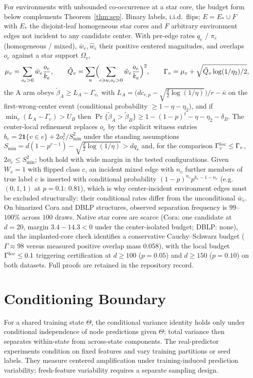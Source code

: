 \documentclass[preprint,11pt]{elsarticle}
\newcommand{\ind}[1]{\mathbf{1}\{#1\}}
\begin{document}
For environments with unbounded co-occurrence at a star core, the
budget form below complements Theorem~\ref{thm:sep}. Binary labels,
i.i.d.\ flips; $E=E_\ast\cup F$ with $E_\ast$ the disjoint-leaf
homogeneous star cores and $F$ arbitrary environment edges not
incident to any candidate center. With per-edge rates $q_e$ /
$\pi_e$ (homogeneous / mixed), $\bar w_e,\hat w_e$ their positive
centered magnitudes, and overlaps $o_e$ against a star support
$\Omega_v$,
\[
\mu_v=\sum_{o_e>0}\bar w_e\frac{o_e}{k_e},\qquad
\tilde Q_v=\sum_u\Bigl(\sum_{e\ni u,o_e>0}\hat w_e\frac{o_e}{k_e}
\Bigr)^2,\qquad
\Gamma_v=\mu_v+\sqrt{\tilde Q_v\log(1/\eta_2)/2},
\]
the A arm obeys $\widetilde\beta_A\ge L_A-\Gamma_{v_\ast}$ with
$L_A=\bigl(dc_{r,p}-\sqrt{\tfrac d2\log(1/\eta)}\bigr)/r-\bar\kappa$
on the first-wrong-center event (conditional probability
$\ge1-\eta-\eta_2$), and if $\min_v(L_A-\Gamma_v)>U_B$ then
$\Pr\{\widetilde\beta_A>\widetilde\beta_B\}\ge
1-(1-p)^t-\eta-\eta_2-\delta_B$. The center-local refinement
replaces $o_e$ by the explicit witness entries $b_e
=2\ind{v\in e}+2o_e^2/S_{\min}^2$ under the standing assumptions
$S_{\min}=d(1-p^{r-1})-\sqrt{\tfrac d2\log(1/\eta)}>dq_r$ and, for
the comparison $\Gamma_v^{\rm loc}\le\Gamma_v$,
$2o_e\le S_{\min}^2$; both hold with wide margin in the tested
configurations. Given $W_v=1$ with flipped class $c$, an incident
mixed edge with $n_c$ further members of true label $c$ is inserted
with conditional probability $(1-p)^{n_c}p^{k_e-1-n_c}$ (e.g.\
$(0,1,1)$ at $p=0.1$: $0.81$), which is why center-incident
environment edges must be excluded structurally: their conditional
rates differ from the unconditional $\bar w_e$. On binarized Cora and
DBLP structures, observed separation frequency is $99$--$100\%$ across
$100$ draws. Native star cores are scarce (Cora: one candidate at
$d=20$, margin $3.4-14.3<0$ under the center-isolated budget; DBLP: none), and the
implanted-core check identifies a conservative Cauchy--Schwarz budget
($\Gamma\approx98$ versus measured positive overlap mass $0.058$),
with the local budget $\Gamma^{\rm loc}\le0.1$ triggering certification
at $d\ge100$ ($p=0.05$) and $d\ge150$ ($p=0.10$) on both datasets.
Full proofs are retained in the repository record.

\section{Conditioning Boundary}\label{app:identification}
For a shared training state $\Theta$, the conditional variance
identity holds only under conditional independence of node
predictions given $\Theta$; total variance then separates
within-state from across-state components. The real-predictor
experiments condition on fixed features and vary training partitions
or seed labels. They measure centered amplification under
training-induced prediction variability; fresh-feature variability
requires a separate sampling design.
\end{document}
